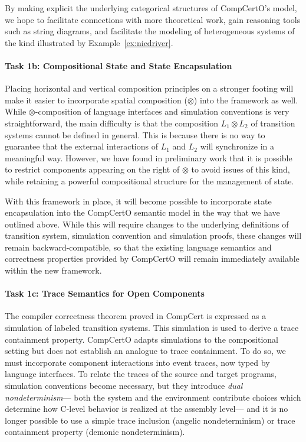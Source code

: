 By making explicit the underlying categorical structures
of CompCertO's model,
we hope to facilitate connections with more theoretical work,
gain reasoning tools such as string diagrams,
and facilitate the modeling of heterogeneous systems
of the kind illustrated by Example~\ref{ex:nicdriver}.

\vspace*{-2ex}
\paragraph*{Task 1b: Compositional State and State Encapsulation}

Placing horizontal and vertical composition principles
on a stronger footing will make it easier to incorporate
spatial composition ($\otimes$) into the framework as well.
While $\otimes$-composition of
language interfaces and simulation conventions is very straightforward,
the main difficulty is that
the composition $L_1 \otimes L_2$ of transition systems
cannot be defined in general.
This is because there is no way to guarantee that
the external interactions of $L_1$ and $L_2$
will synchronize in a meaningful way.
However,
we have found in preliminary work that
it is possible to restrict components appearing on the right of $\otimes$
to avoid issues of this kind,
while retaining a powerful compositional structure
for the management of state.

With this framework in place,
it will become possible to incorporate state encapsulation
into the CompCertO semantic model in the way that we have outlined above.
While this will require changes to the underlying definitions of
transition system, simulation convention and simulation proofs,
these changes will remain backward-compatible,
so that the existing
language semantics and correctness properties provided by CompCertO
will remain immediately available within the new framework.

\vspace*{-2ex}
\paragraph*{Task 1c: Trace Semantics for Open Components}
The compiler correctness theorem proved in CompCert
is expressed as a simulation of labeled transition systems.
This simulation is used to derive
a trace containment property.
CompCertO adapts simulations
to the compositional setting
but does not establish
an analogue to trace containment.
To do so,
we must incorporate component interactions
into event traces,
now typed by language interfaces.
To relate the traces of the source and target programs,
simulation conventions become necessary,
but they introduce
\emph{dual nondeterminism}---%
both the system and the environment contribute choices
which determine how C-level behavior is realized at the assembly level---%
and it is no longer possible to use
a simple trace inclusion (angelic nondeterminism)
or trace containment property (demonic nondeterminism).

